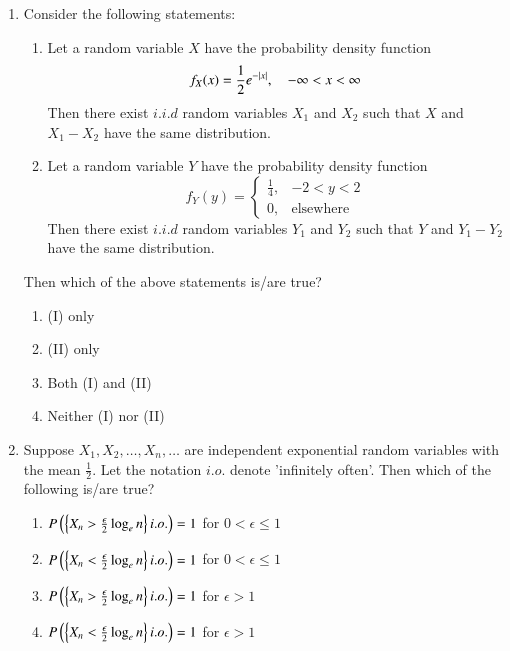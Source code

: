 \documentclass[journal]{IEEEtran}
\begin{document}
\begin{enumerate}
    \item Consider the following statements:
        \begin{enumerate}[label = (\Roman*)]
            \item Let a random variable $X$ have the probability density function $$f_{X}(x)=\frac{1}{2}e^{-\left\vert x\right\vert},\quad-\infty<x<\infty$$ Then there exist $i.i.d$ random variables $X_1$ and $X_2$ such that $X$ and $X_1-X_2$ have the same distribution.
            \item Let a random variable $Y$ have the probability density function $$f_{Y}(y)=
                \begin{cases}
                    \frac{1}{4}, & -2<y<2 \\
                    0, & \text{elsewhere}
                \end{cases}$$
                Then there exist $i.i.d$ random variables $Y_1$ and $Y_2$ such that $Y$ and $Y_1-Y_2$ have the same distribution.
        \end{enumerate}
        Then which of the above statements is/are true?
        \begin{enumerate}
            \item (I) only 
            \item (II) only 
            \item Both (I) and (II)
            \item Neither (I) nor (II) 
        \end{enumerate}
    
    \item Suppose $X_1, X_2, \dots, X_{n}, \dots$ are independent exponential random variables with the mean $\frac{1}{2}$. Let the notation $i.o.$ denote 'infinitely often'. Then which of the following is/are true?
        \begin{enumerate}
            \item $P\left(\left\{X_{n}>\frac{\epsilon}{2}\log_{e}n\right\}i.o.\right)=1$ for $0<\epsilon\leq1$
            \item $P\left(\left\{X_{n}<\frac{\epsilon}{2}\log_{e}n\right\}i.o.\right)=1$ for $0<\epsilon\leq1$
            \item $P\left(\left\{X_{n}>\frac{\epsilon}{2}\log_{e}n\right\}i.o.\right)=1$ for $\epsilon>1$
            \item $P\left(\left\{X_{n}<\frac{\epsilon}{2}\log_{e}n\right\}i.o.\right)=1$ for $\epsilon>1$
        \end{enumerate}


\end{enumerate}
\end{document}

